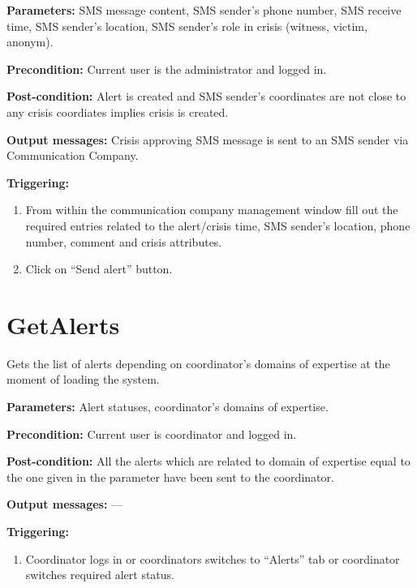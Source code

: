 \begin{description}

\item \textbf{Parameters:} SMS message content, SMS sender's phone number, SMS
receive time, SMS sender's location, SMS sender's role in crisis (witness,
victim, anonym).
\item \textbf{Precondition:} Current user is the administrator and logged in.
\item \textbf{Post-condition:} Alert is created and SMS sender's
coordinates are not close to any crisis coordiates implies crisis is created.
\item \textbf{Output messages:} Crisis approving SMS message is sent to an SMS
sender via Communication Company.

\item \textbf{Triggering:}
\begin{enumerate}
\item From within the communication company management window fill out the
required entries related to the alert/crisis time, SMS sender's location, phone
number, comment and crisis attributes.
\item Click on ``Send alert'' button.
\end{enumerate}
 
\end{description}

\section{GetAlerts}
\label{operation:GetAlerts}
 Gets the list of alerts depending on coordinator's domains of expertise at the
 moment of loading the system.

\begin{description}

\item \textbf{Parameters:} Alert statuses, coordinator's domains of expertise.
\item \textbf{Precondition:} Current user is coordinator and logged
in.
\item \textbf{Post-condition:} All the alerts which are related to domain of
expertise equal to the one given in the parameter have been sent to the
coordinator.
\item \textbf{Output messages:} ---

\item \textbf{Triggering:}
\begin{enumerate}
\item Coordinator logs in or coordinators switches to ``Alerts'' tab or
coordinator switches required alert status.
\end{enumerate}
 
\end{description}

